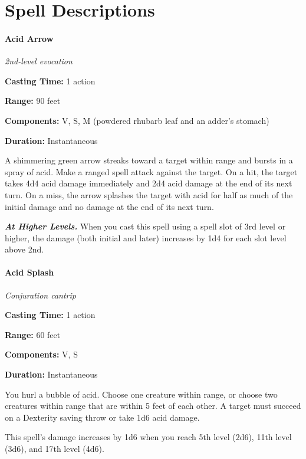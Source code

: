 \documentclass[
]{article}
\date{}
\begin{document}
\hypertarget{spell-descriptions}{%
\section{Spell Descriptions}\label{spell-descriptions}}

\hypertarget{acid-arrow}{%
\paragraph{Acid Arrow}\label{acid-arrow}}

\emph{2nd-level evocation}

\textbf{Casting Time:} 1 action

\textbf{Range:} 90 feet

\textbf{Components:} V, S, M (powdered rhubarb leaf and an adder's
stomach)

\textbf{Duration:} Instantaneous

A shimmering green arrow streaks toward a target within range and bursts
in a spray of acid. Make a ranged spell attack against the target. On a
hit, the target takes 4d4 acid damage immediately and 2d4 acid damage at
the end of its next turn. On a miss, the arrow splashes the target with
acid for half as much of the initial damage and no damage at the end of
its next turn.

\emph{\textbf{At Higher Levels.}} When you cast this spell using a spell
slot of 3rd level or higher, the damage (both initial and later)
increases by 1d4 for each slot level above 2nd.

\hypertarget{acid-splash}{%
\paragraph{Acid Splash}\label{acid-splash}}

\emph{Conjuration cantrip}

\textbf{Casting Time:} 1 action

\textbf{Range:} 60 feet

\textbf{Components:} V, S

\textbf{Duration:} Instantaneous

You hurl a bubble of acid. Choose one creature within range, or choose
two creatures within range that are within 5 feet of each other. A
target must succeed on a Dexterity saving throw or take 1d6 acid damage.

This spell's damage increases by 1d6 when you reach 5th level (2d6),
11th level (3d6), and 17th level (4d6).
\end{document}
